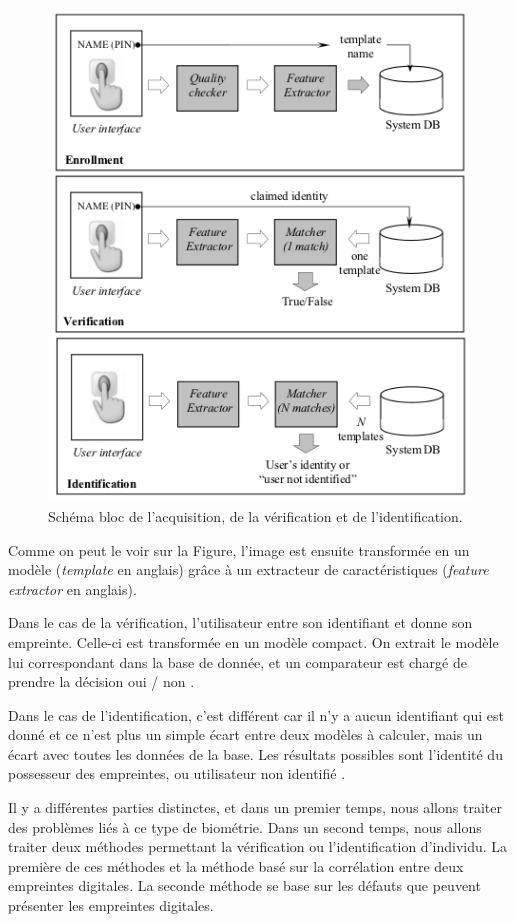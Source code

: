 \begin{figure}[H]
\centering
\includegraphics[scale=0.8]{three_way.png}
\caption{Schéma bloc de l'acquisition, de la vérification et de
  l'identification.}
\label{fig:schema-bloc-acq}
\end{figure}

Comme on peut le voir sur la Figure, l'image est ensuite transformée
en un modèle (\emph{template} en anglais) grâce à un extracteur de
caractéristiques (\emph{feature extractor} en anglais).

Dans le cas de la vérification, l'utilisateur entre son identifiant et
donne son empreinte. Celle-ci est transformée en un modèle compact.
On extrait le modèle lui correspondant dans la base de donnée, et un
comparateur est chargé de prendre la décision \og oui / non \fg.

Dans le cas de l'identification, c'est différent car il n'y a aucun
identifiant qui est donné et ce n'est plus un simple écart entre deux
modèles à calculer, mais un écart avec toutes les données de la base.
Les résultats possibles sont l'identité du possesseur des empreintes,
ou \og utilisateur non identifié \fg.

Il y a différentes parties distinctes, et dans un premier temps, nous
allons traiter des problèmes liés à ce type de biométrie. Dans un
second temps, nous allons traiter deux méthodes permettant la
vérification ou l'identification d'individu. La première de ces
méthodes et la méthode basé sur la corrélation entre deux empreintes
digitales. La seconde méthode se base sur les défauts que peuvent
présenter les empreintes digitales.


